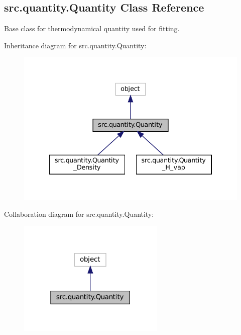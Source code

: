 \hypertarget{classsrc_1_1quantity_1_1Quantity}{}\subsection{src.\+quantity.\+Quantity Class Reference}
\label{classsrc_1_1quantity_1_1Quantity}


Base class for thermodynamical quantity used for fitting.  




Inheritance diagram for src.\+quantity.\+Quantity\+:
\nopagebreak
\begin{figure}[H]
\begin{center}
\leavevmode
\includegraphics[width=334pt]{classsrc_1_1quantity_1_1Quantity__inherit__graph}
\end{center}
\end{figure}


Collaboration diagram for src.\+quantity.\+Quantity\+:
\nopagebreak
\begin{figure}[H]
\begin{center}
\leavevmode
\includegraphics[width=198pt]{classsrc_1_1quantity_1_1Quantity__coll__graph}
\end{center}
\end{figure}
